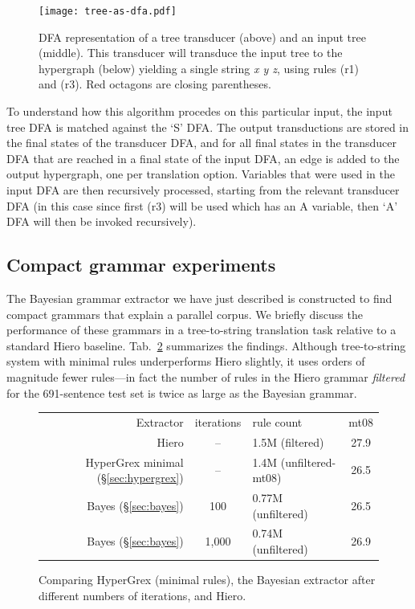 \documentclass[nofonts]{pbml} %
\begin{document}
\begin{figure}[t]
\centering
\texttt{[image: tree-as-dfa.pdf]}
\caption{\label{fig:det}DFA representation of a tree transducer (above) and an input tree (middle). This transducer will transduce the input tree to the hypergraph (below) yielding a single string \emph{x y z}, using rules (r1) and (r3). Red octagons are closing parentheses.}
\end{figure}

To understand how this algorithm procedes on this particular input, the input tree DFA is matched against the `S' DFA. The output transductions are stored in the final states of the transducer DFA, and for all final states in the transducer DFA that are reached in a final state of the input DFA, an edge is added to the output hypergraph, one per translation option. Variables that were used in the input DFA are then recursively processed, starting from the relevant transducer DFA (in this case since first (r3) will be used which has an A variable, then `A' DFA will then be invoked recursively).


\subsection{Compact grammar experiments}
The Bayesian grammar extractor we have just described is constructed to find compact grammars that explain a parallel corpus. We briefly discuss the performance of these grammars in a tree-to-string translation task relative to a standard Hiero baseline. Tab.~\ref{bleuresults_worm} summarizes the findings. Although tree-to-string system with minimal rules underperforms Hiero slightly, it uses orders of magnitude fewer rules---in fact the number of rules in the Hiero grammar \emph{filtered} for the 691-sentence test set is twice as large as the Bayesian grammar.

\begin{figure}[ht!]
\centering
\begin{tabular}{r c l c}
Extractor & iterations & rule count & mt08 \\
Hiero & -- & 1.5M (filtered) & 27.9 \\
HyperGrex minimal (\S\ref{sec:hypergrex}) & -- & 1.4M (unfiltered-mt08) & 26.5 \\
Bayes (\S\ref{sec:bayes}) & 100 & 0.77M (unfiltered) & 26.5 \\
Bayes (\S\ref{sec:bayes}) & 1,000 & 0.74M (unfiltered) & 26.9 \\
\end{tabular}
\caption{Comparing HyperGrex (minimal rules), the Bayesian extractor after different numbers of iterations, and Hiero.
\label{bleuresults_worm}}
\end{figure}
\end{document}
